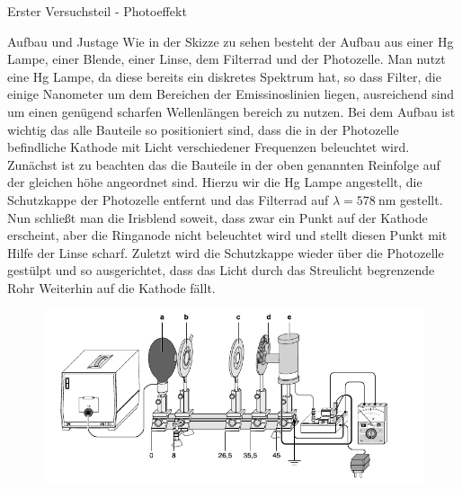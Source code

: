 \documentclass[pdftex, a4paper,11pt, twoside, ngerman]{report}
\begin{document}
          
          
          
  \begin{chapter}{Erster Versuchsteil - Photoeffekt}
    \label{chp:Photoeffekt}
    
    
    
    \begin{section}{Aufbau und Justage}
      \label{chp:photoeffekt:sec:AufbauJustage}
      Wie in der Skizze zu sehen besteht der Aufbau aus einer Hg Lampe, einer
      Blende, einer Linse, dem Filterrad und der Photozelle. Man nutzt eine Hg 
      Lampe, da diese bereits ein diskretes Spektrum hat, so dass Filter, die 
      einige Nanometer um dem Bereichen der Emissinoslinien liegen, 
      ausreichend sind um einen genügend scharfen Wellenlängen bereich zu 
      nutzen. Bei dem Aufbau ist wichtig das alle Bauteile so positioniert 
      sind, dass die in der Photozelle befindliche Kathode mit Licht 
      verschiedener Frequenzen beleuchtet wird. Zunächst ist zu beachten das 
      die Bauteile in der oben genannten Reinfolge auf der gleichen höhe 
      angeordnet sind. Hierzu wir die Hg Lampe angestellt, die Schutzkappe der 
      Photozelle entfernt und das Filterrad auf $\lambda = 
      \SI{578}{\nano\meter}$ gestellt. Nun schließt man die Irisblend soweit, 
      dass zwar ein Punkt auf der Kathode erscheint, aber die Ringanode nicht 
      beleuchtet wird und stellt diesen Punkt mit Hilfe der Linse scharf. 
      Zuletzt wird die Schutzkappe wieder über die Photozelle gestülpt und so 
      ausgerichtet, dass das Licht durch das Streulicht begrenzende Rohr 
      Weiterhin auf die Kathode fällt.
      \begin{figure}[htbp]
        \begin{center}
          \includegraphics[width=.9\textwidth]{Figures/Planckaufbau.png}

\end{center}
\end{figure}
\end{section}
\end{chapter}
\end{document}
